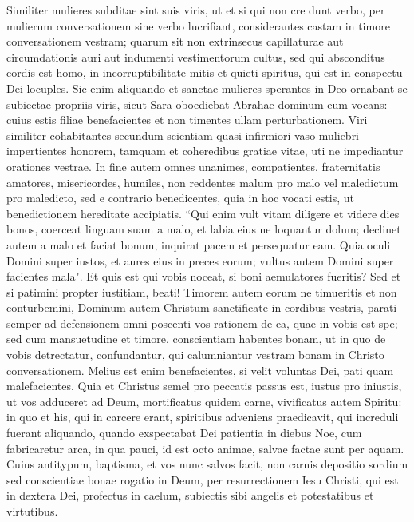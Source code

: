 \begin{biblechapter}  
\verse Similiter mulieres subditae sint suis viris, ut et si qui non cre dunt verbo, per mulierum conversationem sine verbo lucrifiant, 
\verse considerantes castam in timore conversationem vestram; 
\verse quarum sit non extrinsecus capillaturae aut circumdationis auri aut indumenti vestimentorum cultus, 
\verse sed qui absconditus cordis est homo, in incorruptibilitate mitis et quieti spiritus, qui est in conspectu Dei locuples. 
\verse Sic enim aliquando et sanctae mulieres sperantes in Deo ornabant se subiectae propriis viris, 
\verse sicut Sara oboediebat Abrahae dominum eum vocans: cuius estis filiae benefacientes et non timentes ullam perturbationem. 
\verse Viri similiter cohabitantes secundum scientiam quasi infirmiori vaso muliebri impertientes honorem, tamquam et coheredibus gratiae vitae, uti ne impediantur orationes vestrae. 
\verse In fine autem omnes unanimes, compatientes, fraternitatis amatores, misericordes, humiles, 
\verse non reddentes malum pro malo vel maledictum pro maledicto, sed e contrario benedicentes, quia in hoc vocati estis, ut benedictionem hereditate accipiatis. 
\verse “Qui enim vult vitam diligere et videre dies bonos, coerceat linguam suam a malo, 
\verse et labia eius ne loquantur dolum; declinet autem a malo et faciat bonum, inquirat pacem et persequatur eam. 
\verse Quia oculi Domini super iustos, et aures eius in preces eorum; vultus autem Domini super facientes mala". 
\verse Et quis est qui vobis noceat, si boni aemulatores fueritis? 
\verse Sed et si patimini propter iustitiam, beati! Timorem autem eorum ne timueritis et non conturbemini, 
\verse Dominum autem Christum sanctificate in cordibus vestris, parati semper ad defensionem omni poscenti vos rationem de ea, quae in vobis est spe; 
\verse sed cum mansuetudine et timore, conscientiam habentes bonam, ut in quo de vobis detrectatur, confundantur, qui calumniantur vestram bonam in Christo conversationem. 
\verse Melius est enim benefacientes, si velit voluntas Dei, pati quam malefacientes. 
\verse Quia et Christus semel pro peccatis passus est, iustus pro iniustis, ut vos adduceret ad Deum, mortificatus quidem carne, vivificatus autem Spiritu: 
\verse in quo et his, qui in carcere erant, spiritibus adveniens praedicavit, 
\verse qui increduli fuerant aliquando, quando exspectabat Dei patientia in diebus Noe, cum fabricaretur arca, in qua pauci, id est octo animae, salvae factae sunt per aquam. 
\verse Cuius antitypum, baptisma, et vos nunc salvos facit, non carnis depositio sordium sed conscientiae bonae rogatio in Deum, per resurrectionem Iesu Christi, 
\verse qui est in dextera Dei, profectus in caelum, subiectis sibi angelis et potestatibus et virtutibus. 
\end{biblechapter}

